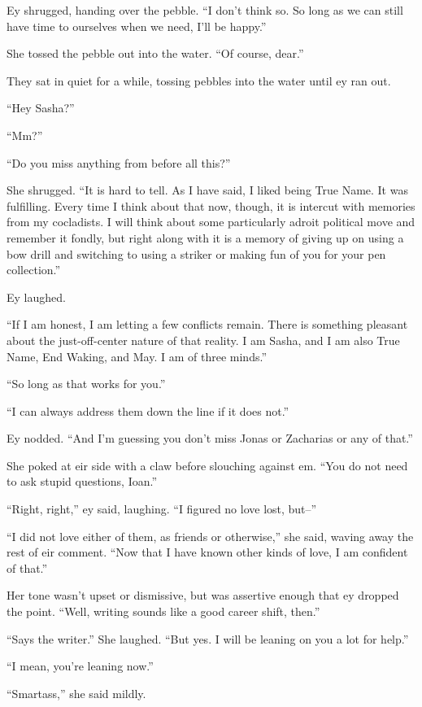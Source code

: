 Ey shrugged, handing over the pebble. ``I don't think so. So long as we can still have time to ourselves when we need, I'll be happy.''

She tossed the pebble out into the water. ``Of course, dear.''

They sat in quiet for a while, tossing pebbles into the water until ey ran out.

``Hey Sasha?''

``Mm?''

``Do you miss anything from before all this?''

She shrugged. ``It is hard to tell. As I have said, I liked being True Name. It was fulfilling. Every time I think about that now, though, it is intercut with memories from my cocladists. I will think about some particularly adroit political move and remember it fondly, but right along with it is a memory of giving up on using a bow drill and switching to using a striker or making fun of you for your pen collection.''

Ey laughed.

``If I am honest, I am letting a few conflicts remain. There is something pleasant about the just-off-center nature of that reality. I am Sasha, and I am also True Name, End Waking, and May. I am of three minds.''

``So long as that works for you.''

``I can always address them down the line if it does not.''

Ey nodded. ``And I'm guessing you don't miss Jonas or Zacharias or any of that.''

She poked at eir side with a claw before slouching against em. ``You do not need to ask stupid questions, Ioan.''

``Right, right,'' ey said, laughing. ``I figured no love lost, but--''

``I did not love either of them, as friends or otherwise,'' she said, waving away the rest of eir comment. ``Now that I have known other kinds of love, I am confident of that.''

Her tone wasn't upset or dismissive, but was assertive enough that ey dropped the point. ``Well, writing sounds like a good career shift, then.''

``Says the writer.'' She laughed. ``But yes. I will be leaning on you a lot for help.''

``I mean, you're leaning now.''

``Smartass,'' she said mildly.

